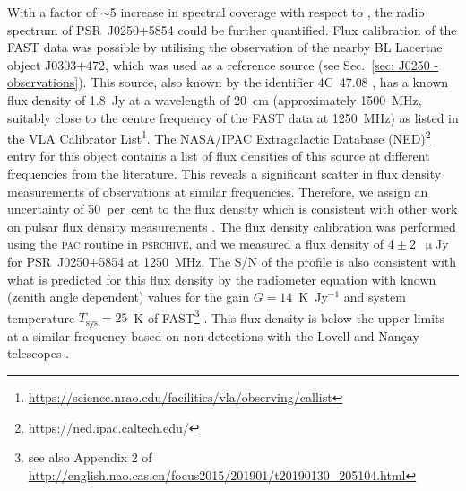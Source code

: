 With a factor of $\sim$5 increase in spectral coverage with respect to \citet{TBC+2018}, the radio spectrum of PSR~J0250+5854 could be further quantified. Flux calibration of the FAST data was possible by utilising the observation of the nearby BL Lacertae object J0303+472, which was used as a reference source (see Sec.~\ref{sec: J0250 - observations}). This source, also known by the identifier 4C~47.08 \citep{VVxx2006}, has a known flux density of 1.8~Jy at a wavelength of 20~cm (approximately 1500~MHz, suitably close to the centre frequency of the FAST data at 1250~MHz) as listed in the VLA Calibrator List\footnote{\url{https://science.nrao.edu/facilities/vla/observing/callist}}. The NASA/IPAC Extragalactic Database (NED)\footnote{\url{https://ned.ipac.caltech.edu/}} entry for this object contains a list of flux densities of this source at different frequencies from the literature. This reveals a significant scatter in flux density measurements of observations at similar frequencies. Therefore, we assign an uncertainty of 50~per~cent to the flux density which is consistent with other work on pulsar flux density measurements \citep[e.g.][]{Sxxx1973}. The flux density calibration was performed using the \textsc{pac} routine in \textsc{psrchive}, and we measured a flux density of $4\pm2$~$\upmu$Jy for PSR~J0250+5854 at 1250~MHz. The S/N of the profile is also consistent with what is predicted for this flux density by the radiometer equation \citep[e.g.][]{Handbook} with known (zenith angle dependent) values for the gain $G = 14$~K~Jy$^{-1}$ and system temperature $T_\mathrm{sys} = 25$~K of FAST\footnote{see also Appendix 2 of \url{http://english.nao.cas.cn/focus2015/201901/t20190130_205104.html}} \citep{LWQ+2018}. This flux density is below the upper limits at a similar frequency based on non-detections with the Lovell and Nan\c{c}ay telescopes \citep{TBC+2018}.

